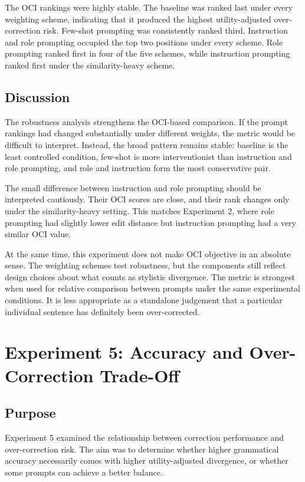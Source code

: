 The OCI rankings were highly stable. The baseline was ranked last under every weighting scheme, indicating that it produced the highest utility-adjusted over-correction risk. Few-shot prompting was consistently ranked third. Instruction and role prompting occupied the top two positions under every scheme. Role prompting ranked first in four of the five schemes, while instruction prompting ranked first under the similarity-heavy scheme.

\subsection{Discussion}

The robustness analysis strengthens the OCI-based comparison. If the prompt rankings had changed substantially under different weights, the metric would be difficult to interpret. Instead, the broad pattern remains stable: baseline is the least controlled condition, few-shot is more interventionist than instruction and role prompting, and role and instruction form the most conservative pair.

The small difference between instruction and role prompting should be interpreted cautiously. Their OCI scores are close, and their rank changes only under the similarity-heavy setting. This matches Experiment 2, where role prompting had slightly lower edit distance but instruction prompting had a very similar OCI value.

At the same time, this experiment does not make OCI objective in an absolute sense. The weighting schemes test robustness, but the components still reflect design choices about what counts as stylistic divergence. The metric is strongest when used for relative comparison between prompts under the same experimental conditions. It is less appropriate as a standalone judgement that a particular individual sentence has definitely been over-corrected.

\section{Experiment 5: Accuracy and Over-Correction Trade-Off}

\subsection{Purpose}

Experiment 5 examined the relationship between correction performance and over-correction risk. The aim was to determine whether higher grammatical accuracy necessarily comes with higher utility-adjusted divergence, or whether some prompts can achieve a better balance.

